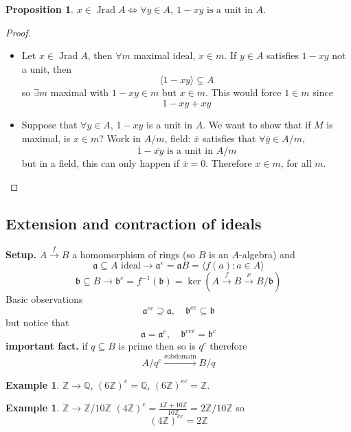 \documentclass[11pt,a4paper]{article}
\theoremstyle{definition}
\newtheorem{example}[definition]{Example}
\theoremstyle{plain}
\newtheorem{proposition}[definition]{Proposition}
\theoremstyle{remark}
\newcommand{\Z}{\mathbb{Z}}
\newcommand{\Q}{\mathbb{Q}}
\newcommand{\angles}[1]{\langle #1 \rangle}
\begin{document}
\begin{proposition}
    $x \in \operatorname{Jrad} A \iff \forall y \in A, \ 1 - xy \text{ is a unit in } A$. 
\end{proposition}

\begin{proof}
    \begin{itemize}
        \item[$\implies$] Let $x \in \operatorname{Jrad} A$, then $\forall m$ maximal ideal, $x \in m$. If $y \in A$ satisfies $1 - xy$ not a unit, then 
        $$\angles{1 - xy} \subsetneq A$$
        so $\exists m$ maximal with $1 - xy \in m$ but $x \in m$. This would force $1 \in m$ since 
        $$1 - xy + xy$$
        \item[$\impliedby$] Suppose that $\forall y \in A$, $1 - xy$ is a unit in $A$. We want to show that if $M$ is maximal, is $x \in m$? 
        Work in $A / m$, field: $\overline{x}$ satisfies that $\forall \overline{y} \in A / m$, 
        $$\overline{1} - \overline{xy} \text{ is a unit in } A / m$$
        but in a field, this can only happen if $\overline{x} = \overline{0}$. Therefore $x \in m$, for all $m$. 
    \end{itemize}
\end{proof}

\subsection{Extension and contraction of ideals} 
\textbf{Setup.} $A \xrightarrow{f} B$ a homomorphism of rings (so $B$ is an $A$-algebra) and 
$$\mathfrak{a} \subseteq A \text{ ideal} \to \mathfrak{a}^e = \mathfrak{a} B = \angles{f(a) \colon a \in A}$$
$$\mathfrak{b} \subseteq B \to \mathfrak{b}^c = f^{-1} (\mathfrak{b}) = \ker \left(A \xrightarrow{f} B \xrightarrow{\nu} B / \mathfrak{b}\right)$$
Basic observations 
$$\mathfrak{a}^{ec} \supseteq \mathfrak{a}, \quad \mathfrak{b}^{ce} \subseteq \mathfrak{b}$$
but notice that 
$$\mathfrak{a} = \mathfrak{a}^e, \quad \mathfrak{b}^{cec} = \mathfrak{b}^c$$
\textbf{important fact.} if $q \subseteq B$ is prime then so is $q^c$ therefore 
$$A / q^c \xrightarrow{\text{subdomain}} B / q$$
\begin{example}
    $\Z \to \Q$, $(6 \Z)^e = \Q$, 
    $(6 \Z)^{ec} = \Z$. 
\end{example}

\begin{example}
    $\Z \to \Z / 10 \Z$
    $(4\Z)^e = \frac{4 \Z + 10 \Z}{10 \Z} = 2\Z / 10 \Z$ 
    so 
    $$(4 \Z)^{ec} = 2 \Z$$
\end{example}
\end{document}
